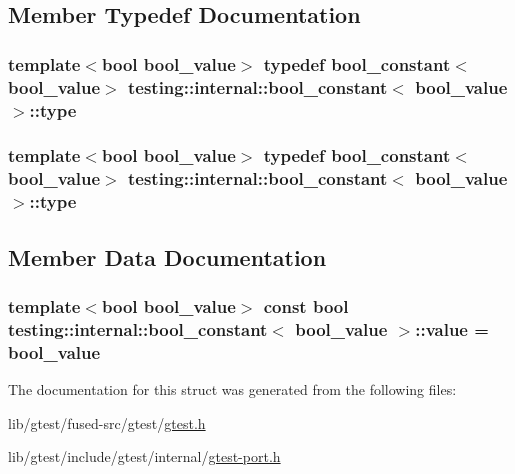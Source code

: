 \subsection{Member Typedef Documentation}
\hypertarget{structtesting_1_1internal_1_1bool__constant_aba6d09ecf7eecea6c93480f0d627a167}{
\subsubsection[{type}]{\setlength{\rightskip}{0pt plus 5cm}template$<$bool bool\-\_\-value$>$ typedef {\bf bool\-\_\-constant}$<$bool\-\_\-value$>$ {\bf testing\-::internal\-::bool\-\_\-constant}$<$ bool\-\_\-value $>$\-::{\bf type}}}\label{structtesting_1_1internal_1_1bool__constant_aba6d09ecf7eecea6c93480f0d627a167}
\hypertarget{structtesting_1_1internal_1_1bool__constant_aba6d09ecf7eecea6c93480f0d627a167}{
\subsubsection[{type}]{\setlength{\rightskip}{0pt plus 5cm}template$<$bool bool\-\_\-value$>$ typedef {\bf bool\-\_\-constant}$<$bool\-\_\-value$>$ {\bf testing\-::internal\-::bool\-\_\-constant}$<$ bool\-\_\-value $>$\-::{\bf type}}}\label{structtesting_1_1internal_1_1bool__constant_aba6d09ecf7eecea6c93480f0d627a167}


\subsection{Member Data Documentation}
\hypertarget{structtesting_1_1internal_1_1bool__constant_a499fba6576296b04d99690a486424b32}{
\subsubsection[{value}]{\setlength{\rightskip}{0pt plus 5cm}template$<$bool bool\-\_\-value$>$ const bool {\bf testing\-::internal\-::bool\-\_\-constant}$<$ bool\-\_\-value $>$\-::value = bool\-\_\-value\hspace{0.3cm}{\ttfamily [static]}}}\label{structtesting_1_1internal_1_1bool__constant_a499fba6576296b04d99690a486424b32}


The documentation for this struct was generated from the following files\-:\begin{DoxyCompactItemize}
\item 
lib/gtest/fused-\/src/gtest/\hyperlink{fused-src_2gtest_2gtest_8h}{gtest.\-h}\item 
lib/gtest/include/gtest/internal/\hyperlink{gtest-port_8h}{gtest-\/port.\-h}\end{DoxyCompactItemize}
